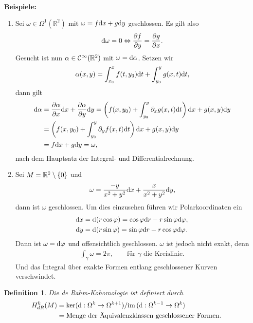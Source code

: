 \documentclass[12pt,a4paper]{article}
\def\R{\mathbb{R}}
\def\im{\mathrm{im}\,}
\newtheorem{Definition}[Lemma]{Definition}
\begin{document}
{\bf Beispiele:}
\begin{enumerate}
\item Sei $\omega\in\Omega^1(\R^2)$ mit $\omega = f\mathrm{d}x + g\mathrm{d}y$ geschlossen.
Es gilt also
\begin{align*}
\mathrm{d}\omega = 0 \Leftrightarrow \frac{\partial f}{\partial y} = \frac{\partial
g}{\partial x}.
\end{align*}
Gesucht ist nun $\alpha\in\CC^\infty(\R^2)$ mit $\omega = \mathrm{d}\alpha$. Setzen
wir
\begin{align*}
\alpha(x,y) = \int_{x_0}^x f(t,y_0)\mathrm{d}t + \int_{y_0}^y g(x,t)\mathrm{d}t,
\end{align*}
dann gilt
\begin{align*}
\mathrm{d}\alpha &= \frac{\partial \alpha}{\partial x} \mathrm{d}x + \frac{\partial
\alpha}{\partial y}\mathrm{d}y 
= \left(f(x,y_0) + \int_{y_0}^y \partial_x g(x,t)\mathrm{d}t\right) \mathrm{d}x
+ g(x,y)\mathrm{d}y\\
&=\left(f(x,y_0) + \int_{y_0}^y \partial_y f(x,t)\mathrm{d}t\right) \mathrm{d}x
+ g(x,y)\mathrm{d}y\\
&= f\mathrm{d}x + g\mathrm{d}y = \omega,
\end{align*}
nach dem Hauptsatz der Integral- und Differentialrechnung.

\item Sei $M=\R^2\setminus\setd{0}$ und
\begin{align*}
\omega = \frac{-y}{x^2+y^2}\mathrm{d}x + \frac{x}{x^2+y^2}\mathrm{d}y,
\end{align*}
dann ist $\omega$ geschlossen. Um dies einzusehen f\"uhren wir Polarkoordinaten
ein
\begin{align*}
\mathrm{d}x &= \mathrm{d}(r\cos\varphi) = \cos\varphi \mathrm{d} r - r\sin\varphi\mathrm{d}\varphi,\\
\mathrm{d}y &= \mathrm{d}(r\sin\varphi) = \sin\varphi \mathrm{d} r + r\cos\varphi\mathrm{d}\varphi.
\end{align*}
Dann ist $\omega = \mathrm{d}\varphi$ und offensichtlich geschlossen. $\omega$ ist jedoch
nicht exakt, denn
\begin{align*}
\int_\gamma \omega = 2\pi,\qquad \text{f\"ur }\gamma \text{ die Kreislinie}.
\end{align*}
Und das Integral \"uber exakte Formen entlang geschlossener Kurven verschwindet.
\end{enumerate}

\bigskip

\begin{Definition}
Die \emph{de Rahm-Kohomologie} ist definiert durch
\begin{align*}
H_{dR}^k(M) &= \ker(\diffd: \Omega^k\to \Omega^{k+1})/\im(\diffd:
\Omega^{k-1}\to \Omega^k)\\
&=\text{Menge der \"Aquivalenzklassen geschlossener Formen}.
\end{align*}
\end{Definition}
\end{document}
